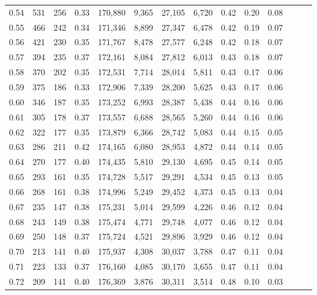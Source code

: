 \begin{tabular}{rrrrrrrrrrrrrr}
0.54 &    531 &  256 &  0.33 &  170,880 &    9,365 &  27,105 &   6,720 &  0.42 &  0.20 &      0.08 \\
0.55 &    466 &  242 &  0.34 &  171,346 &    8,899 &  27,347 &   6,478 &  0.42 &  0.19 &      0.07 \\
0.56 &    421 &  230 &  0.35 &  171,767 &    8,478 &  27,577 &   6,248 &  0.42 &  0.18 &      0.07 \\
0.57 &    394 &  235 &  0.37 &  172,161 &    8,084 &  27,812 &   6,013 &  0.43 &  0.18 &      0.07 \\
0.58 &    370 &  202 &  0.35 &  172,531 &    7,714 &  28,014 &   5,811 &  0.43 &  0.17 &      0.06 \\
0.59 &    375 &  186 &  0.33 &  172,906 &    7,339 &  28,200 &   5,625 &  0.43 &  0.17 &      0.06 \\
0.60 &    346 &  187 &  0.35 &  173,252 &    6,993 &  28,387 &   5,438 &  0.44 &  0.16 &      0.06 \\
0.61 &    305 &  178 &  0.37 &  173,557 &    6,688 &  28,565 &   5,260 &  0.44 &  0.16 &      0.06 \\
0.62 &    322 &  177 &  0.35 &  173,879 &    6,366 &  28,742 &   5,083 &  0.44 &  0.15 &      0.05 \\
0.63 &    286 &  211 &  0.42 &  174,165 &    6,080 &  28,953 &   4,872 &  0.44 &  0.14 &      0.05 \\
0.64 &    270 &  177 &  0.40 &  174,435 &    5,810 &  29,130 &   4,695 &  0.45 &  0.14 &      0.05 \\
0.65 &    293 &  161 &  0.35 &  174,728 &    5,517 &  29,291 &   4,534 &  0.45 &  0.13 &      0.05 \\
0.66 &    268 &  161 &  0.38 &  174,996 &    5,249 &  29,452 &   4,373 &  0.45 &  0.13 &      0.04 \\
0.67 &    235 &  147 &  0.38 &  175,231 &    5,014 &  29,599 &   4,226 &  0.46 &  0.12 &      0.04 \\
0.68 &    243 &  149 &  0.38 &  175,474 &    4,771 &  29,748 &   4,077 &  0.46 &  0.12 &      0.04 \\
0.69 &    250 &  148 &  0.37 &  175,724 &    4,521 &  29,896 &   3,929 &  0.46 &  0.12 &      0.04 \\
0.70 &    213 &  141 &  0.40 &  175,937 &    4,308 &  30,037 &   3,788 &  0.47 &  0.11 &      0.04 \\
0.71 &    223 &  133 &  0.37 &  176,160 &    4,085 &  30,170 &   3,655 &  0.47 &  0.11 &      0.04 \\
0.72 &    209 &  141 &  0.40 &  176,369 &    3,876 &  30,311 &   3,514 &  0.48 &  0.10 &      0.03 \\

\end{tabular}
